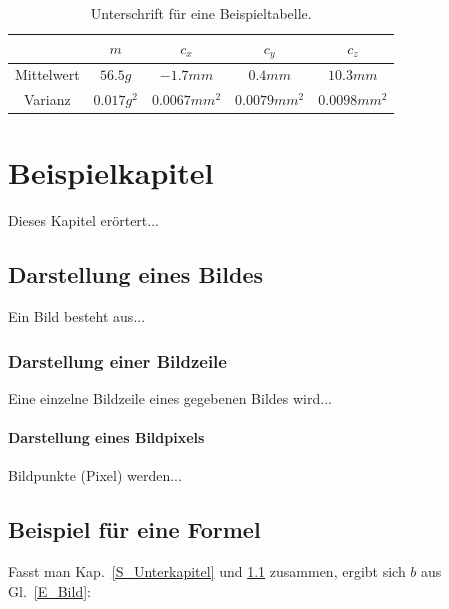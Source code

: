 \documentclass[german, 10pt]{report}
\begin{document}
\begin{table}[h]
    \centering
    \begin{tabular}{|c|c|c|c|c|}\hline
        &$m$ & $c_{x}$  & $c_{y}$ & $c_{z}$\\\hline
        Mittelwert & $56.5g$ & $-1.7mm$ & $0.4mm$ & $10.3mm$\\\hline
        Varianz & $0.017g^2$ & $0.0067mm^2$ & $0.0079mm^2$ & $0.0098mm^2$\\\hline
    \end{tabular}
    \caption{\label{T_BeispielTabelle}Unterschrift f\"{u}r eine Beispieltabelle.}
\end{table}


\chapter{Beispielkapitel}
\label{C_Kapitel}Dieses Kapitel er\"{o}rtert...


\section{Darstellung eines Bildes}
\label{S_Bild}Ein Bild besteht aus...


\subsection{Darstellung einer Bildzeile}
\label{S_Bildzeile}Eine einzelne Bildzeile eines gegebenen Bildes
wird...


\subsubsection{Darstellung eines Bildpixels}
\label{S_Bildpixels}Bildpunkte (Pixel) werden...



\section{Beispiel f\"{u}r eine Formel}
\label{S_Formel}Fasst man Kap.~\ref{S_Unterkapitel} und \ref{S_Bild}
zusammen, ergibt sich $b$ aus Gl.~\ref{E_Bild}:
\end{document}
